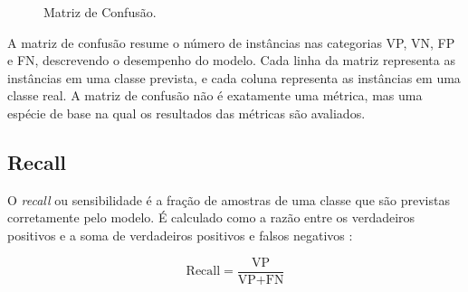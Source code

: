 \begin{figure}[H]
\begin{center}
\caption{Matriz de Confusão.}
\end{center}
\end{figure}

A matriz de confusão resume o número de instâncias nas categorias VP, VN, FP e FN, descrevendo o desempenho do modelo. Cada linha da matriz representa as instâncias em uma classe prevista, e cada coluna representa as instâncias em uma classe real. A matriz de confusão não é exatamente uma métrica, mas uma espécie de base na qual os resultados das métricas são avaliados.

\subsection{Recall}

O \textit{recall} ou sensibilidade é a fração de amostras de uma classe que são previstas corretamente pelo modelo. É calculado como a razão entre os verdadeiros positivos e a soma de verdadeiros positivos e falsos negativos \cite{Métricas}:

\begin{center}
\begin{equation}
\text{Recall} = \dfrac{\text{VP
}}{\text{VP} + \text{FN}}
\end{equation}
\end{center}

